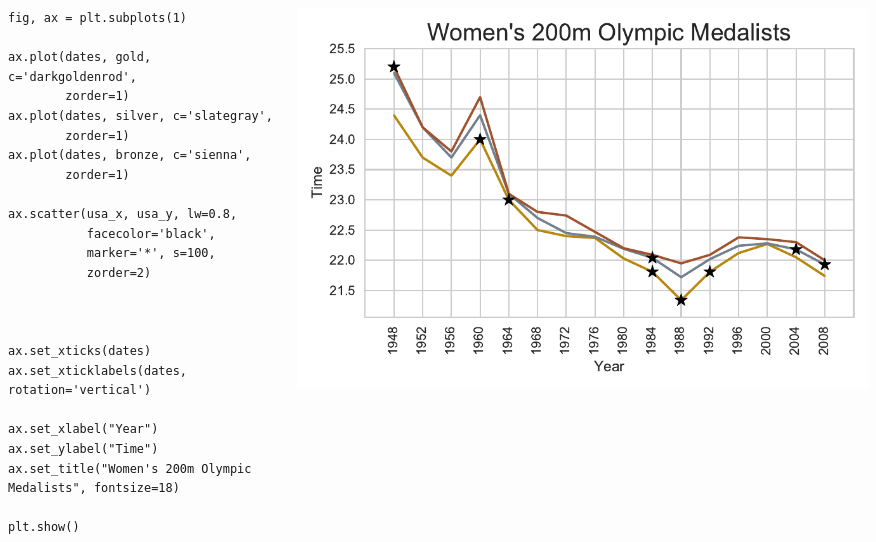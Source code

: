 \documentclass{beamer}
\begin{document}
\begin{frame}[fragile]
\tiny{
\begin{columns}
\begin{column}{0.45\textwidth}
\begin{verbatim}
fig, ax = plt.subplots(1)

ax.plot(dates, gold, c='darkgoldenrod',
        zorder=1)
ax.plot(dates, silver, c='slategray',
        zorder=1)
ax.plot(dates, bronze, c='sienna',
        zorder=1)

ax.scatter(usa_x, usa_y, lw=0.8,
           facecolor='black',
           marker='*', s=100,
           zorder=2)



ax.set_xticks(dates)
ax.set_xticklabels(dates, rotation='vertical')

ax.set_xlabel("Year")
ax.set_ylabel("Time")
ax.set_title("Women's 200m Olympic Medalists", fontsize=18)

plt.show()
\end{verbatim}
\end{column}
\begin{column}{0.55\textwidth}
\includegraphics[width=\textwidth]{../olympics_6.pdf}
\end{column}
\end{columns}
}
\end{frame}
\end{document}
